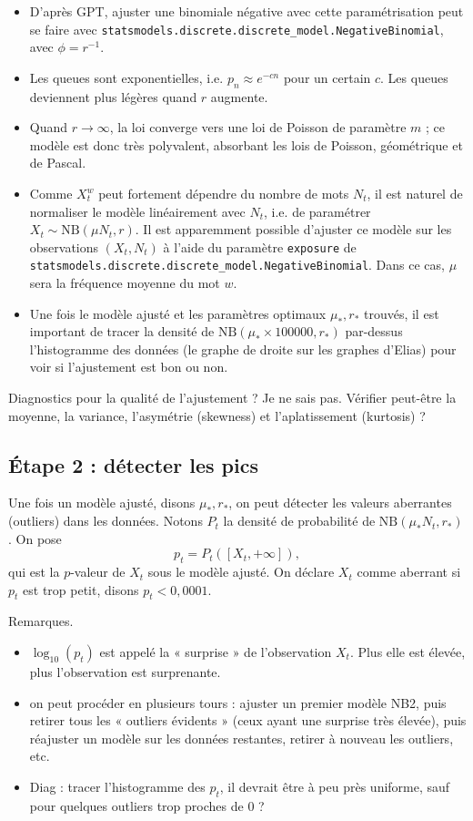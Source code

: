 \documentclass[12pt,a4paper]{article}
\begin{document}
\begin{itemize}
    \item D'après GPT, ajuster une binomiale négative avec cette paramétrisation peut se faire avec \texttt{statsmodels.discrete.discrete\_model.NegativeBinomial}, avec $\phi = r^{-1}$.
    \item Les queues sont exponentielles, i.e. $p_n \approx e^{-c n}$ pour un certain $c$. Les queues deviennent plus légères quand $r$ augmente.
    \item Quand $r \to \infty$, la loi converge vers une loi de Poisson de paramètre $m$ ; ce modèle est donc très polyvalent, absorbant les lois de Poisson, géométrique et de Pascal.
    \item Comme $X^w_t$ peut fortement dépendre du nombre de mots $N_t$, il est naturel de normaliser le modèle linéairement avec $N_t$, i.e. de paramétrer $X_t \sim \mathrm{NB}(\mu N_t, r)$. Il est apparemment possible d'ajuster ce modèle sur les observations $(X_t, N_t)$ à l'aide du paramètre \texttt{exposure} de \texttt{statsmodels.discrete.discrete\_model.NegativeBinomial}. Dans ce cas, $\mu$ sera la fréquence moyenne du mot $w$.
    \item Une fois le modèle ajusté et les paramètres optimaux $\mu_*, r_*$ trouvés, il est important de tracer la densité de $\mathrm{NB}(\mu_* \times 100000, r_*)$ par-dessus l'histogramme des données (le graphe de droite sur les graphes d'Elias) pour voir si l'ajustement est bon ou non.
\end{itemize}

\bigskip

Diagnostics pour la qualité de l'ajustement ? Je ne sais pas. Vérifier peut-être la moyenne, la variance, l'asymétrie (skewness) et l'aplatissement (kurtosis) ?

\subsection{Étape 2 : détecter les pics}

Une fois un modèle ajusté, disons $\mu_*, r_*$, on peut détecter les valeurs aberrantes (outliers) dans les données. Notons $P_t$ la densité de probabilité de $\mathrm{NB}(\mu_* N_t, r_*)$. On pose
$$p_t = P_t([X_t, +\infty]), $$
qui est la $p$-valeur de $X_t$ sous le modèle ajusté. On déclare $X_t$ comme aberrant si $p_t$ est trop petit, disons $p_t < 0{,}0001$.

Remarques.
\begin{itemize}
\item $\log_{10}(p_t)$ est appelé la « surprise » de l'observation $X_t$. Plus elle est élevée, plus l'observation est surprenante.
\item on peut procéder en plusieurs tours : ajuster un premier modèle NB2, puis retirer tous les « outliers évidents » (ceux ayant une surprise très élevée), puis réajuster un modèle sur les données restantes, retirer à nouveau les outliers, etc.
\item Diag : tracer l'histogramme des $p_t$, il devrait être à peu près uniforme, sauf pour quelques outliers trop proches de $0$ ?
\end{itemize}
\end{document}
